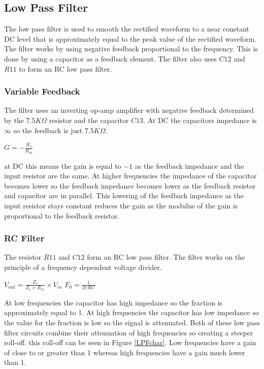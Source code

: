 \documentclass[10pt,a4paper]{article}
\begin{document}
\subsection{Low Pass Filter}
The low pass filter is used to smooth the rectified waveform to a near constant DC level that is approximately equal to the peak value of the rectified waveform. The filter works by using negative feedback proportional to the frequency. This is done by using a capacitor as a feedback element. The filter also uses $C12$ and $R11$ to form an RC low pass filter.
\subsubsection{Variable Feedback}
The filter uses an inverting op-amp amplifier with negative feedback determined by the $7.5K\Omega$ resistor and the capacitor $C13$. At DC the capacitors impedance is $\infty$ so the feedback is just $7.5K\Omega$.
\begin{center}
\Huge
$G=-\frac{R_f}{R_{in}}$
\end{center}   
\cite{BEGrob}
at DC this means the gain is equal to $-1$ as the feedback impedance and the input resistor are the same. At higher frequencies the impedance of the capacitor becomes lower so the feedback impedance becomes lower as the feedback resistor and capacitor are in parallel. This lowering of the feedback impedance as the input resistor stays constant reduces the gain as the modulus of the gain is proportional to the feedback resistor.
\subsubsection{RC Filter}
The resistor $R11$ and $C12$ form an RC low pass filter. The filter works on the principle of a frequency dependent voltage divider.
\begin{center}
\Huge
$V_{out} = \frac{Z_c}{Z_c + R_{11}} \times V_{in}$
\newline
$F_0 = \frac{1}{2\pi RC}$
\end{center}
At low frequencies the capacitor has high impedance so the fraction is approximately equal to 1. At high frequencies the capacitor has low impedance so the value for the fraction is low so the signal is attenuated. Both of these low pass filter circuits combine their attenuation of high frequencies so creating a steeper roll-off.
this roll-off can be seen in Figure \ref{LPFchar}. Low frequencies have a gain of close to or greater than 1 whereas high frequencies have a gain much lower than 1.
\end{document}
